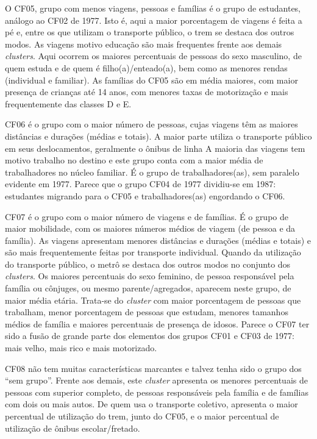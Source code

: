 O CF05, grupo com menos viagens, pessoas e famílias é o grupo de estudantes, análogo ao CF02 de 1977.
Isto é, aqui a maior porcentagem de viagens é feita a pé e, entre os que utilizam o transporte público, o trem se destaca dos outros modos. 
As viagens motivo educação são mais frequentes frente aos demais \textit{clusters}.
Aqui ocorrem os maiores percentuais de pessoas do sexo masculino, de quem estuda e de quem é filho(a)/enteado(a), bem como as menores rendas (individual e familiar). As famílias do CF05 são em média maiores, com maior presença de crianças até 14 anos, com menores taxas de motorização e mais frequentemente das classes D e E.

CF06 é o grupo com o maior número de pessoas, cujas viagens têm as maiores distâncias e durações (médias e totais).
A maior parte utiliza o transporte público em seus deslocamentos, geralmente o ônibus de linha 
A maioria das viagens tem motivo trabalho no destino e este grupo conta com a maior média de trabalhadores no núcleo familiar.
É o grupo de trabalhadores(as), sem paralelo evidente em 1977. Parece que o grupo CF04 de 1977 dividiu-se em 1987: estudantes migrando para o CF05 e trabalhadores(as) engordando o CF06.

CF07 é o grupo com o maior número de viagens e de famílias. 
É o grupo de maior mobilidade, com os maiores números médios de viagem (de pessoa e da família). 
As viagens apresentam menores distâncias e durações (médias e totais) e são mais frequentemente feitas por transporte individual. 
Quando da utilização do transporte público, o metrô se destaca dos outros modos no conjunto dos \textit{clusters}.
Os maiores percentuais do sexo feminino, de pessoa responsável pela família ou cônjuges, ou mesmo parente/agregados, aparecem neste grupo, de maior média etária.
Trata-se do \textit{cluster} com maior porcentagem de pessoas que trabalham, menor porcentagem de pessoas que estudam, menores tamanhos médios de família e maiores percentuais de presença de idosos.
Parece o CF07  ter sido a fusão de grande parte dos elementos dos grupos CF01 e CF03 de 1977: mais velho, mais rico e mais motorizado.

CF08 não tem muitas características marcantes e talvez tenha sido o grupo dos ``sem grupo''.
Frente aos demais, este \textit{cluster} apresenta os menores percentuais de pessoas com superior completo, de pessoas responsáveis pela família e de famílias com dois ou mais autos. 
De quem usa o transporte coletivo, apresenta o maior percentual de utilização do trem, junto do CF05, e o maior percentual de utilização de ônibus escolar/fretado.

